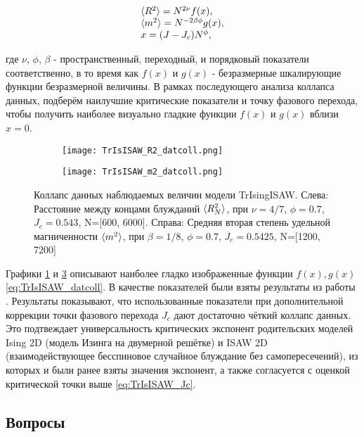 \begin{equation}
\begin{array}{l}
\label{eq:TrIsISAW_datcoll}
\langle R^2 \rangle = N^{2\nu} f(x), \\
\langle m^2 \rangle = N^{-2\beta\phi} g(x), \\
x = (J-J_c) N^{\phi},
\end{array}
\end{equation}

где $\nu$, $\phi$, $\beta$  - пространственный, переходный, и порядковый показатели соответственно, в то время как $f(x)$ и $g(x)$ - безразмерные шкалирующие функции безразмерной величины.
В рамках последующего анализа коллапса данных, подберём наилучшие критические показатели и точку фазового перехода, 
чтобы получить наиболее визуально гладкие функции $f(x)$ и $g(x)$ вблизи $x=0$.


\begin{figure}[h]
\begin{subfigure}{0.49\textwidth}
\texttt{[image: TrIsISAW\_R2\_datcoll.png]}
\caption{}
\label{fig:TrIsISAW_R2_datcoll}
\end{subfigure}
\hfill
\begin{subfigure}{0.49\textwidth}
\texttt{[image: TrIsISAW\_m2\_datcoll.png]}
\caption{}
\label{fig:TrIsISAW_m2_datcoll}
\end{subfigure}
\caption{Коллапс данных наблюдаемых величин модели TrIsingISAW.
Слева: Расстояние между концами блужданий $\langle R^2_N \rangle$, при $\nu = 4/7$, $\phi=0.7$, $J_c = 0.543$, N=[600, 6000].
Справа: Средняя вторая степень удельной магниченности $\langle m^2 \rangle$, при $\beta = 1/8$, $\phi=0.7$, $J_c = 0.5425$, N=[1200, 7200]}
\end{figure}

Графики \ref{fig:TrIsISAW_R2_datcoll} и \ref{fig:TrIsISAW_m2_datcoll} описывают наиболее гладко изображенные функции $f(x), g(x)$ \eqref{eq:TrIsISAW_datcoll}.
В качестве показателей были взяты результаты из работы \cite{faizullina2021critical}.
Результаты показывают, что использованные показатели при дополнительной коррекции точки фазового перехода $J_c$ дают достаточно чёткий коллапс данных.
Это подтвеждает универсальность критических экспонент родительских моделей Ising 2D (модель Изинга на двумерной решётке) 
и ISAW 2D (взаимодействующее бесспиновое случайное блуждание без самопересечений), из которых и были ранее взяты значения экспонент,
а также согласуется с оценкой критической точки выше \eqref{eq:TrIsISAW_Jc}.


\subsection{Вопросы}


